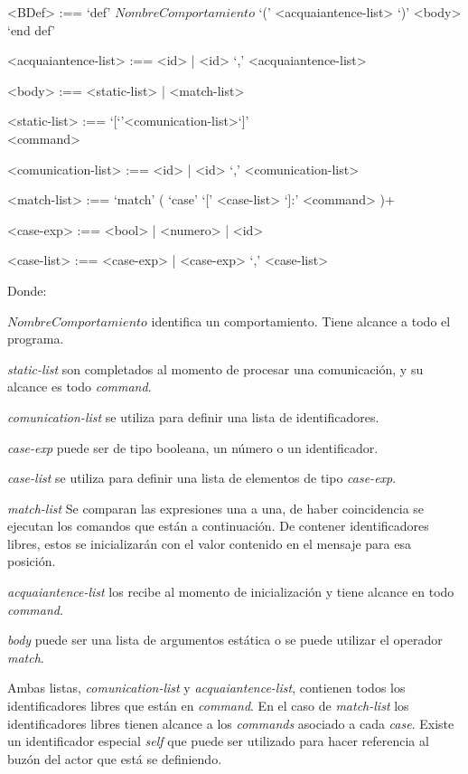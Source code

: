 \begin{grammar}
<BDef> :== `def' $NombreComportamiento$ `(' <acquaiantence-list> `)' <body> `end def'

<acquaiantence-list> :== <id> | <id> `,' <acquaiantence-list> 

<body> :== <static-list> | <match-list>

<static-list> :== `[`'<comunication-list>`]' \\ <command>

<comunication-list> :== <id> | <id> `,' <comunication-list>

<match-list> :==  `match' ( `case' `[' <case-list> `]:' <command> )+  

<case-exp> :== <bool> | <numero> | <id>  

<case-list> :== <case-exp> | <case-exp> `,' <case-list> 


\end{grammar}

Donde: 

\begin{description}
 \item $NombreComportamiento$ identifica un comportamiento. Tiene alcance a todo el programa. 
 \item \textit{static-list} son completados al momento de procesar una comunicación, y su alcance es todo \textit{command}. 
 \item \textit{comunication-list} se utiliza para definir una lista de identificadores.
 \item \textit{case-exp} puede ser de tipo booleana, un número o un identificador. 
 \item \textit{case-list} se utiliza para definir una lista de elementos de tipo \textit{case-exp}.
 \item \textit{match-list} Se comparan las expresiones una a una, de haber coincidencia se ejecutan los comandos que están a continuación. De contener identificadores libres, estos se inicializarán con el valor contenido en el mensaje para esa posición.
 \item \textit{acquaiantence-list} los recibe al momento de inicialización y tiene alcance en todo \textit{command}.
 \item \textit{body} puede ser una lista de argumentos estática o se puede utilizar el operador \textit{match}.
\end{description}

Ambas listas, \textit{comunication-list} y \textit{acquaiantence-list}, contienen todos los identificadores libres que están en \textit{command}. En el caso de \textit{match-list} los identificadores libres tienen alcance a los \textit{commands} asociado a cada \textit{case}. Existe un identificador especial \textit{self} que puede ser utilizado para hacer referencia al buzón del actor que está se definiendo. 


